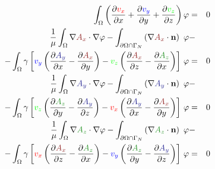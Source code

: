 \documentclass[smallextended]{svjour3}       %
\begin{document}
\begin{eqnarray}
			\int_{\Omega} \left(\frac{\partial \textcolor{red}{v_x}}{\partial x} + \frac{\partial \textcolor{blue}{v_y}}{\partial y} + \frac{\partial \textcolor{green}{v_z}}{\partial z}\right) \varphi & = & 0 \\
			\frac{1}{\mu}\int_{\Omega}\nabla \textcolor{darkRed}{A_x} \cdot \nabla \varphi - \int_{\partial \Omega \cap \Gamma_{N}} \left(\nabla \textcolor{darkRed}{A_x}\cdot \mathbf{n}\right)\ \varphi 
			 \nonumber& - \\
			-  \int_{\Omega} \gamma \left[\textcolor{blue}{v_y} \left(\frac{\partial \textcolor{darkBlue}{A_y}}{\partial x} - \frac{\partial \textcolor{darkRed}{A_x}}{\partial y}\right) - \textcolor{green}{v_z} \left(\frac{\partial \textcolor{darkRed}{A_x}}{\partial z} - \frac{\partial \textcolor{darkGreen}{A_z}}{\partial x}\right)\right]\,\varphi & = & 0 \\			
			\frac{1}{\mu}\int_{\Omega}\nabla \textcolor{darkBlue}{A_y} \cdot \nabla \varphi - \int_{\partial \Omega \cap \Gamma_{N}} \left(\nabla \textcolor{darkBlue}{A_y}\cdot \mathbf{n}\right)\ \varphi 
			 \nonumber& - \\
			- \int_{\Omega} \gamma \left[\textcolor{green}{v_z} \left(\frac{\partial \textcolor{darkGreen}{A_z}}{\partial y} - \frac{\partial \textcolor{darkBlue}{A_y}}{\partial z}\right) - \textcolor{red}{v_x} \left(\frac{\partial \textcolor{darkBlue}{A_y}}{\partial x} - \frac{\partial \textcolor{darkRed}{A_x}}{\partial y}\right)\right]\,\varphi & = & 0 \\			
			\frac{1}{\mu}\int_{\Omega}\nabla \textcolor{darkGreen}{A_z} \cdot \nabla \varphi - \int_{\partial \Omega \cap \Gamma_{N}} \left(\nabla \textcolor{darkGreen}{A_z}\cdot \mathbf{n}\right)\ \varphi 
			 \nonumber& - \\
			-  \int_{\Omega} \gamma \left[\textcolor{red}{v_x} \left(\frac{\partial \textcolor{darkRed}{A_x}}{\partial z} - \frac{\partial \textcolor{darkGreen}{A_z}}{\partial x}\right) - \textcolor{blue}{v_y} \left(\frac{\partial \textcolor{darkGreen}{A_z}}{\partial y} - \frac{\partial \textcolor{darkBlue}{A_y}}{\partial z}\right)\right]\,\varphi & = & 0 \\
			 \nonumber 
		\end{eqnarray}
		
\end{document}
